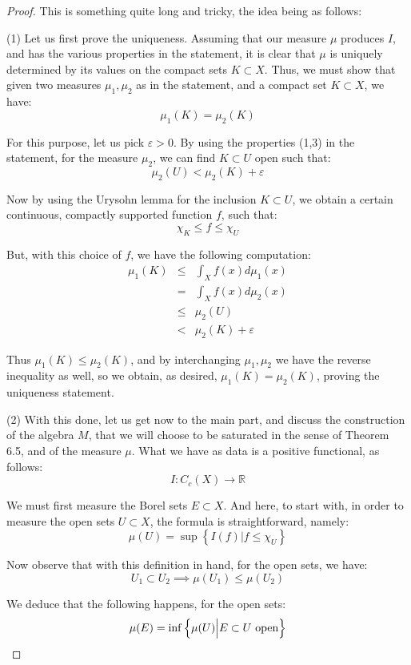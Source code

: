 \documentclass[12pt]{amsbook}
\begin{document}
\begin{proof}
This is something quite long and tricky, the idea being as follows:

\medskip

(1) Let us first prove the uniqueness. Assuming that our measure $\mu$ produces $I$, and has the various properties in the statement, it is clear that $\mu$ is uniquely determined by its values on the compact sets $K\subset X$. Thus, we must show that given two measures $\mu_1,\mu_2$ as in the statement, and a compact set $K\subset X$, we have:
$$\mu_1(K)=\mu_2(K)$$

For this purpose, let us pick $\varepsilon>0$. By using the properties (1,3) in the statement, for the measure $\mu_2$, we can find $K\subset U$ open such that:
$$\mu_2(U)<\mu_2(K)+\varepsilon$$

Now by using the Urysohn lemma for the inclusion $K\subset U$, we obtain a certain continuous, compactly supported function $f$, such that:
$$\chi_K\leq f\leq\chi_U$$

But, with this choice of $f$, we have the following computation:
\begin{eqnarray*}
\mu_1(K)
&\leq&\int_Xf(x)d\mu_1(x)\\
&=&\int_Xf(x)d\mu_2(x)\\
&\leq&\mu_2(U)\\
&<&\mu_2(K)+\varepsilon
\end{eqnarray*}

Thus $\mu_1(K)\leq\mu_2(K)$, and by interchanging $\mu_1,\mu_2$ we have the reverse inequality as well, so we obtain, as desired, $\mu_1(K)=\mu_2(K)$, proving the uniqueness statement.

\medskip

(2) With this done, let us get now to the main part, and discuss the construction of the algebra $M$, that we will choose to be saturated in the sense of Theorem 6.5, and of the measure $\mu$. What we have as data is a positive functional, as follows:
$$I:C_c(X)\to\mathbb R$$

We must first measure the Borel sets $E\subset X$. And here, to start with, in order to measure the open sets $U\subset X$, the formula is straightforward, namely:
$$\mu(U)=\sup\left\{I(f)\Big| f\leq\chi_U\right\}$$

Now observe that with this definition in hand, for the open sets, we have:
$$U_1\subset U_2\implies\mu(U_1)\leq\mu(U_2)$$

We deduce that the following happens, for the open sets:
$$\mu(E)=\inf\left\{\mu(U)\Big| E\subset U\ {\rm open}\right\}$$


\end{proof}
\end{document}
